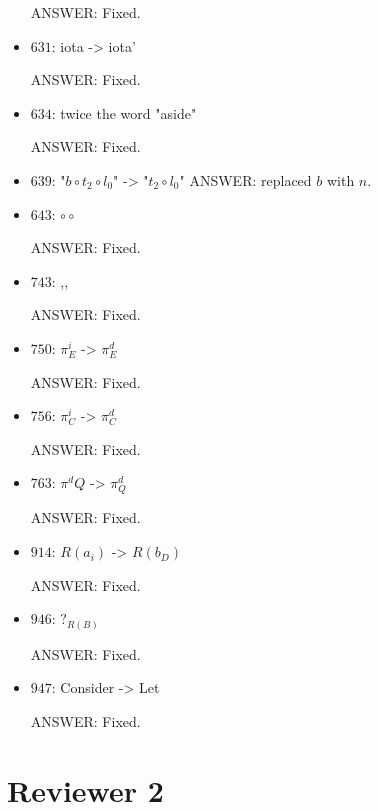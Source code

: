 \documentclass[english,11pt,a4paper]{article}
\begin{document}
\begin{itemize}
ANSWER: Fixed.

\item $631$: iota -> iota'

ANSWER: Fixed.

\item $634$: twice the word "aside"

ANSWER: Fixed.

\item $639$: "$b \circ t_2 \circ l_0$" -> "$t_2 \circ l_0$"
ANSWER: replaced $b$ with $n$.

\item $643$: $\circ \circ$

ANSWER: Fixed.

\item $743$: ,,

ANSWER: Fixed.

\item $750$: $\pi^i_E$ -> $\pi^d_E$

ANSWER: Fixed.

\item $756$: $\pi^i_C$ -> $\pi^d_C$

ANSWER: Fixed.

\item $763$: $\pi^dQ$ -> $\pi^d_Q$

ANSWER: Fixed.

\item $914$: $R(a_i)$ -> $R(b_D)$

ANSWER: Fixed.

\item $946$: $?_{R(B)}$

ANSWER: Fixed.

\item $947$: Consider -> Let

ANSWER: Fixed.

\end{itemize} 
\section*{Reviewer 2}
\end{document}
